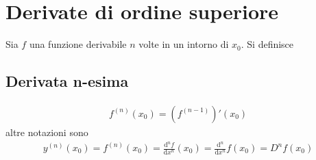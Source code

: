 \documentclass{book}
\begin{document}
\section{Derivate di ordine superiore}
Sia \( f \) una funzione derivabile \( n \) volte in un intorno di \( x_0 \). Si definisce
\begin{definition}
    \subsection{Derivata n-esima}
    \begin{align*}
        f^{(n)}(x_0) = \left(f^{(n-1)}\right)'(x_0)
    \end{align*}
    altre notazioni sono
    \begin{align*}
        y^{(n)}(x_0) = f^{(n)}(x_0) = \frac{\mathrm{d}^n f}{\mathrm{d}x^n}(x_0) = \frac{\mathrm{d}^n}{\mathrm{d}x^n}f(x_0) = D^n f(x_0)
    \end{align*}
\end{definition}
\end{document}
